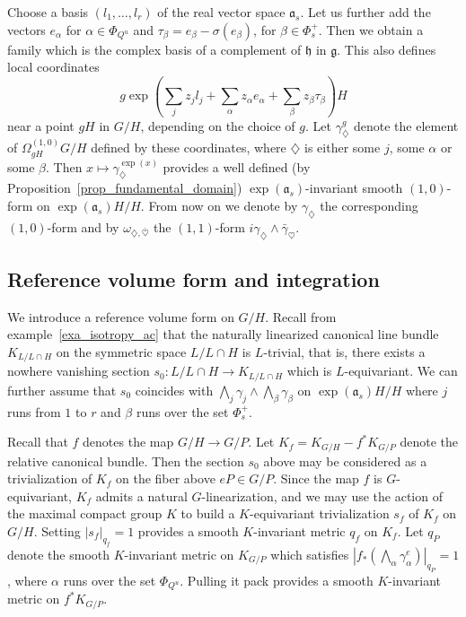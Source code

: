 \documentclass{amsart}
\theoremstyle{definition}
\begin{document}
Choose a basis $(l_1, \ldots, l_r)$ of the real vector space $\mathfrak{a}_s$.
Let us further add the vectors $e_{\alpha}$ for $\alpha\in \Phi_{Q^u}$ and 
$\tau_{\beta}= e_{\beta} -\sigma(e_{\beta})$, 
for $\beta \in \Phi_s^+$. Then we obtain 
a family which is the complex basis of a complement of $\mathfrak{h}$ in 
$\mathfrak{g}$.  
This also defines local coordinates
\[
g\exp\left(\sum_j z_jl_j +\sum_{\alpha}z_{\alpha}e_{\alpha} +\sum_{\beta} z_{\beta}\tau_{\beta}\right)H
\]
 near a point $gH$ in $G/H$, depending on the 
choice of $g$. Let $\gamma_{\diamondsuit}^g$ denote the element of $\Omega^{(1,0)}_{gH} G/H$ 
defined by these coordinates, where $\diamondsuit$ is either some $j$, some $\alpha$ or some $\beta$.
Then $x\mapsto \gamma_{\diamondsuit}^{\exp(x)}$ provides a well defined 
(by Proposition~\ref{prop_fundamental_domain})
$\exp(\mathfrak{a}_s)$-invariant smooth $(1,0)$-form on $\exp(\mathfrak{a}_s)H/H$. 
From now on we denote by $\gamma_{\diamondsuit}$ the corresponding $(1,0)$-form 
and by $\omega_{\diamondsuit,\bar{\heartsuit}}$ the $(1,1)$-form 
$i\gamma_{\diamondsuit}\wedge\bar{\gamma}_{\heartsuit}$. 

\subsection{Reference volume form and integration}

We introduce a reference volume form on $G/H$.
Recall from example~\ref{exa_isotropy_ac} that 
the naturally linearized canonical line bundle $K_{L/L\cap H}$ 
on the symmetric space $L/L\cap H$ is $L$-trivial, 
that is, there exists a nowhere vanishing section 
$s_0 : L/L\cap H \rightarrow K_{L/L\cap H}$ which is $L$-equivariant.
We can further assume that $s_0$ coincides with 
$\bigwedge_{j} \gamma_j \wedge \bigwedge_{\beta} \gamma_\beta$
on $\exp(\mathfrak{a}_s)H/H$ where $j$ runs from $1$ to $r$ and 
$\beta$ runs over the set $\Phi_s^+$. 

Recall that $f$ denotes the map $G/H\rightarrow G/P$. Let 
$K_f = K_{G/H} - f^*K_{G/P}$ denote the relative canonical bundle. 
Then the section $s_0$ above may be considered as a trivialization 
of $K_f$ on the fiber above $eP\in G/P$. Since the map $f$ is 
$G$-equivariant, $K_f$ admits a natural $G$-linearization, 
and we may use the action of the maximal compact group $K$ to build 
a $K$-equivariant trivialization $s_f$ of $K_f$ on $G/H$. 
Setting $|s_f|_{q_f}=1$ provides a smooth $K$-invariant metric $q_f$ on $K_f$.
Let $q_P$ denote the smooth $K$-invariant metric on $K_{G/P}$ which 
satisfies $|f_*(\bigwedge_{\alpha} \gamma_{\alpha}^{e})|_{q_P}=1$, 
where $\alpha$ runs over the set $\Phi_{Q^u}$.
Pulling it pack provides a smooth $K$-invariant metric on $f^*K_{G/P}$.
\end{document}
